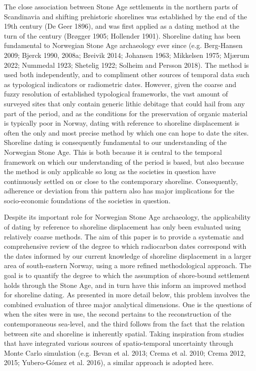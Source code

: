 \documentclass[
]{article}
\begin{document}
The close association between Stone Age settlements in the northern parts of Scandinavia and shifting prehistoric shorelines was established by the end of the 19th century (De Geer 1896), and was first applied as a dating method at the turn of the century (Brøgger 1905; Hollender 1901). Shoreline dating has been fundamental to Norwegian Stone Age archaeology ever since (e.g. Berg-Hansen 2009; Bjerck 1990, 2008a; Breivik 2014; Johansen 1963; Mikkelsen 1975; Mjærum 2022; Nummedal 1923; Shetelig 1922; Solheim and Persson 2018). The method is used both independently, and to compliment other sources of temporal data such as typological indicators or radiometric dates. However, given the coarse and fuzzy resolution of established typological frameworks, the vast amount of surveyed sites that only contain generic lithic debitage that could hail from any part of the period, and as the conditions for the preservation of organic material is typically poor in Norway, dating with reference to shoreline displacement is often the only and most precise method by which one can hope to date the sites. Shoreline dating is consequently fundamental to our understanding of the Norwegian Stone Age. This is both because it is central to the temporal framework on which our understanding of the period is based, but also because the method is only applicable so long as the societies in question have continuously settled on or close to the contemporary shoreline. Consequently, adherence or deviation from this pattern also has major implications for the socio-economic foundations of the societies in question.

Despite its important role for Norwegian Stone Age archaeology, the applicability of dating by reference to shoreline displacement has only been evaluated using relatively coarse methods. The aim of this paper is to provide a systematic and comprehensive review of the degree to which radiocarbon dates correspond with the dates informed by our current knowledge of shoreline displacement in a larger area of south-eastern Norway, using a more refined methodological approach. The goal is to quantify the degree to which the assumption of shore-bound settlement holds through the Stone Age, and in turn have this inform an improved method for shoreline dating. As presented in more detail below, this problem involves the combined evaluation of three major analytical dimensions. One is the questions of when the sites were in use, the second pertains to the reconstruction of the contemporaneous sea-level, and the third follows from the fact that the relation between site and shoreline is inherently spatial. Taking inspiration from studies that have integrated various sources of spatio-temporal uncertainty through Monte Carlo simulation (e.g. Bevan et al. 2013; Crema et al. 2010; Crema 2012, 2015; Yubero-Gómez et al. 2016), a similar approach is adopted here.
\end{document}
